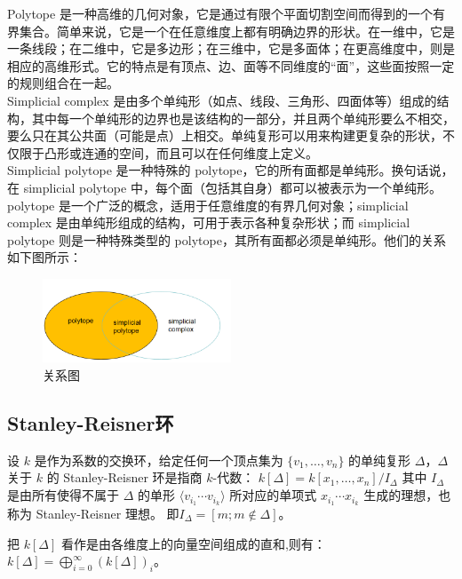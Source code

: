 \begin{remark}
Polytope 是一种高维的几何对象，它是通过有限个平面切割空间而得到的一个有界集合。简单来说，它是一个在任意维度上都有明确边界的形状。在一维中，它是一条线段；在二维中，它是多边形；在三维中，它是多面体；在更高维度中，则是相应的高维形式。它的特点是有顶点、边、面等不同维度的“面”，这些面按照一定的规则组合在一起。\\
Simplicial complex 是由多个单纯形（如点、线段、三角形、四面体等）组成的结构，其中每一个单纯形的边界也是该结构的一部分，并且两个单纯形要么不相交，要么只在其公共面（可能是点）上相交。单纯复形可以用来构建更复杂的形状，不仅限于凸形或连通的空间，而且可以在任何维度上定义。\\
Simplicial polytope 是一种特殊的 polytope，它的所有面都是单纯形。换句话说，在 simplicial polytope 中，每个面（包括其自身）都可以被表示为一个单纯形。\\
polytope 是一个广泛的概念，适用于任意维度的有界几何对象；simplicial complex 是由单纯形组成的结构，可用于表示各种复杂形状；而 simplicial polytope 则是一种特殊类型的 polytope，其所有面都必须是单纯形。他们的关系如下图所示：

\begin{figure}[H] %
    \centering
    \includegraphics[width=0.5\textwidth]{关系图.png} %
    \caption{关系图} %
    \label{fig:my_image} %
\end{figure}
\end{remark}


\subsection{Stanley-Reisner环}

\begin{definition}
设 $k$ 是作为系数的交换环，给定任何一个顶点集为 $\{v_1, \ldots, v_n\}$ 的单纯复形 $\Delta$，$\Delta$ 关于 $k$ 的 Stanley-Reisner 环是指商 $k$-代数：
$ k[\Delta] = k[x_1, \ldots, x_n] / I_\Delta $
其中 $I_\Delta$ 是由所有使得不属于 $\Delta$ 的单形 $\langle v_{i_1} \cdots v_{i_k} \rangle$ 所对应的单项式 $x_{i_1} \cdots x_{i_k}$ 生成的理想，也称为 Stanley-Reisner 理想。
即$ I_\Delta = [m; m \notin \Delta] $。
\end{definition}
把 $k[\Delta]$ 看作是由各维度上的向量空间组成的直和,则有：
$k[\Delta]=\bigoplus_{i=0}^{\infty} (k[\Delta])_i。$

